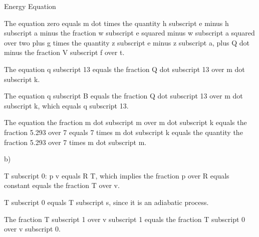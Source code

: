 Energy Equation

The equation zero equals m dot times the quantity h subscript e minus h subscript a minus the fraction w subscript e squared minus w subscript a squared over two plus g times the quantity z subscript e minus z subscript a, plus Q dot minus the fraction V subscript f over t.

The equation q subscript 13 equals the fraction Q dot subscript 13 over m dot subscript k.

The equation q subscript B equals the fraction Q dot subscript 13 over m dot subscript k, which equals q subscript 13.

The equation the fraction m dot subscript m over m dot subscript k equals the fraction 5.293 over 7 equals 7 times m dot subscript k equals the quantity the fraction 5.293 over 7 times m dot subscript m.

b)

T subscript 0: p v equals R T, which implies the fraction p over R equals constant equals the fraction T over v.

T subscript 0 equals T subscript s, since it is an adiabatic process.

The fraction T subscript 1 over v subscript 1 equals the fraction T subscript 0 over v subscript 0.